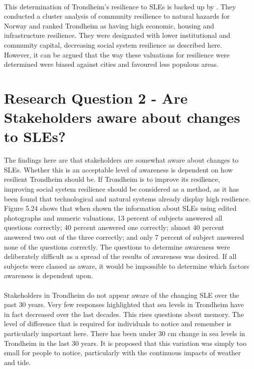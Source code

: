 \paragraph{}
This determination of Trondheim's resilience to SLEs is backed up by \cite{opach_seeking_2020}. They conducted a cluster analysis of community resilience to natural hazards for Norway and ranked Trondheim as having high economic, housing and infrastructure resilience. They were designated with lower institutional and community capital, decreasing social system resilience as described here. However, it can be argued that the way these valuations for resilience were determined were biased against cities and favoured less populous areas.



\section{Research Question 2 - Are Stakeholders aware about changes to SLEs?}

The findings here are that stakeholders are somewhat aware about changes to SLEs. Whether this is an acceptable level of awareness is dependent on how resilient Trondheim should be. If Trondheim is to improve its resilience, improving social system resilience should be considered as a method, as it has been found that technological and natural systems already display high resilience. Figure 5.24 shows that when shown the information about SLEs using edited photographs and numeric valuations, 13 percent of subjects answered all questions correctly; 40 percent answered one correctly; almost 40 percent answered two out of the three correctly; and only 7 percent of subject answered none of the questions correctly. The questions to determine awareness were deliberately difficult as a spread of the results of awareness was desired. If all subjects were classed as aware, it would be impossible to determine which factors awareness is dependent upon. 
\paragraph{}
Stakeholders in Trondheim do not appear aware of the changing SLE over the past 30 years. Very few responses highlighted that sea levels in Trondheim have in fact decreased over the last decades. This rises questions about memory. The level of difference that is required for individuals to notice and remember is particularly important here. There has been under 30 cm change in sea levels in Trondheim in the last 30 years. It is proposed that this variation was simply too small for people to notice, particularly with the continuous impacts of weather and tide. 
